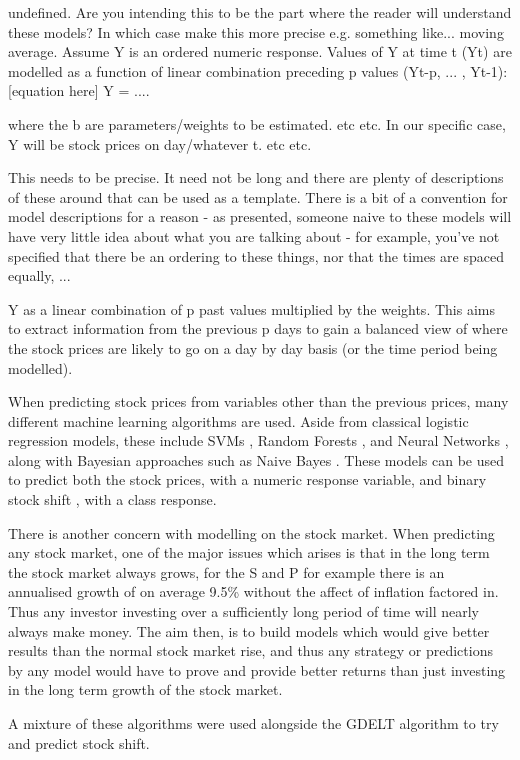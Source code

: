 undefined. Are you intending this to be the part where the reader will understand these models? In which case make this more precise e.g. something like... moving average. Assume Y is an ordered numeric response. Values of Y at time t (Yt) are modelled as a function of linear combination preceding p values (Yt-p, ... , Yt-1): 
[equation here] Y = ....

where the b are parameters/weights to be estimated. etc etc. In our specific case, Y will be stock prices on day/whatever t. etc etc.

This needs to be precise. It need not be long and there are plenty of descriptions of these around that can be used as a template. There is a bit of a convention for model descriptions for a reason - as presented, someone naive to these models will have very little idea about what you are talking about - for example, you've not specified that there be an ordering to these things, nor that the times are spaced equally, ...




Y as a linear combination of p past values multiplied by the weights. This aims to extract information from the previous p days to gain a balanced view of where the stock prices are likely to go on a day by day basis (or the time period being modelled). 


When predicting stock prices from variables other than the previous prices, many different machine learning algorithms are used. Aside from classical logistic regression models, these include SVMs \cite{cao2003support}, Random Forests \cite{khaidem2016predicting}, and Neural Networks \cite{egeli2003stock}, along with Bayesian approaches such as Naive Bayes \cite{khedr2017predicting}. These models can be used to predict both the stock prices, with a numeric response variable, and binary stock shift \cite{nguyen2015sentiment}, with a class response.  

There is another concern with modelling on the stock market. When predicting any stock market, one of the major issues which arises is that in the long term the stock market always grows, for the S and P for example there is an annualised growth of on average 9.5\% \cite{sp} without the affect of inflation factored in. Thus any investor investing over a sufficiently long period of time will nearly always make money. The aim then, is to build models which would give better results than the normal stock market rise, and thus any strategy or predictions by any model would have to prove and provide better returns than just investing in the long term growth of the stock market.

A mixture of these algorithms were used alongside the GDELT algorithm to try and predict stock shift. 

